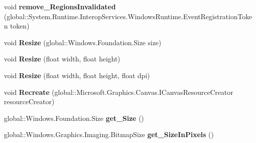 \begin{DoxyCompactItemize}
void {\bfseries remove\+\_\+\+Regions\+Invalidated} (global\+::\+System.\+Runtime.\+Interop\+Services.\+Windows\+Runtime.\+Event\+Registration\+Token token)
\item 
\mbox{\label{interface_microsoft_1_1_graphics_1_1_canvas_1_1_u_i_1_1_xaml_1_1_i_canvas_virtual_image_source_a09dcc1df360a28aaed847abfaa318e7f}} 
void {\bfseries Resize} (global\+::\+Windows.\+Foundation.\+Size size)
\item 
\mbox{\label{interface_microsoft_1_1_graphics_1_1_canvas_1_1_u_i_1_1_xaml_1_1_i_canvas_virtual_image_source_aeae2edb4ee318d5c8112d6d80769828d}} 
void {\bfseries Resize} (float width, float height)
\item 
\mbox{\label{interface_microsoft_1_1_graphics_1_1_canvas_1_1_u_i_1_1_xaml_1_1_i_canvas_virtual_image_source_a933630828281e36bfca92b99181d4c1b}} 
void {\bfseries Resize} (float width, float height, float dpi)
\item 
\mbox{\label{interface_microsoft_1_1_graphics_1_1_canvas_1_1_u_i_1_1_xaml_1_1_i_canvas_virtual_image_source_a0e5a4410e5ef0de72311321fa79114b7}} 
void {\bfseries Recreate} (global\+::\+Microsoft.\+Graphics.\+Canvas.\+I\+Canvas\+Resource\+Creator resource\+Creator)
\item 
\mbox{\label{interface_microsoft_1_1_graphics_1_1_canvas_1_1_u_i_1_1_xaml_1_1_i_canvas_virtual_image_source_a8df57b04f7854479d8d5b4d90588a89a}} 
global\+::\+Windows.\+Foundation.\+Size {\bfseries get\+\_\+\+Size} ()
\item 
\mbox{\label{interface_microsoft_1_1_graphics_1_1_canvas_1_1_u_i_1_1_xaml_1_1_i_canvas_virtual_image_source_a94da0f764a564d73c97f33b5fba21363}} 
global\+::\+Windows.\+Graphics.\+Imaging.\+Bitmap\+Size {\bfseries get\+\_\+\+Size\+In\+Pixels} ()

\end{DoxyCompactItemize}
